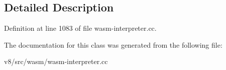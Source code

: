\subsection{Detailed Description}


Definition at line 1083 of file wasm-\/interpreter.\+cc.



The documentation for this class was generated from the following file\+:\begin{DoxyCompactItemize}
\item 
v8/src/wasm/wasm-\/interpreter.\+cc\end{DoxyCompactItemize}
